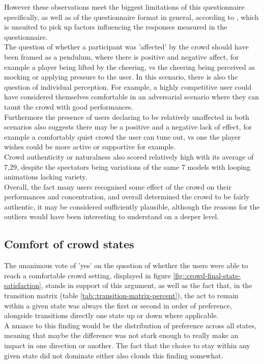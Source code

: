 However these observations meet the biggest limitations of this questionnaire specifically, as well as of the questionnaire format in general, according to \cite{murcia-2020-evaluating}, which is unsuited to pick up factors influencing the responses measured in the questionnaire.\\
The question of whether a participant was 'affected' by the crowd should have been framed as a pendulum, where there is positive and negative affect, for example a player being lifted by the cheering, vs the cheering being perceived as mocking or applying pressure to the user. In this scenario, there is also the question of individual perception. For example, a highly competitive user could have considered themselves comfortable in an adversarial scenario where they can taunt the crowd with good performances.\\
Furthermore the presence of users declaring to be relatively unaffected in both scenarios also suggests there may be a positive and a negative lack of effect, for example a comfortably quiet crowd the user can tune out, vs one the player wishes could be more active or supportive for example.\\

Crowd authenticity or naturalness also scored relatively high with its average of 7,29, despite the spectators being variations of the same 7 models with looping animations lacking variety.\\

Overall, the fact many users recognised some effect of the crowd on their performances and concentration, and overall determined the crowd to be fairly authentic, it may be considered sufficiently plausible, although the reasons for the outliers would have been interesting to understand on a deeper level.\\

\subsection{Comfort of crowd states}

The unanimous vote of 'yes' on the question of whether the users were able to reach a comfortable crowd setting, displayed in figure \ref{fig::crowd-final-state-satisfaction}, stands in support of this argument, as well as the fact that, in the transition matrix (table \ref{tab::transition-matrix-percent}), the act to remain within a given state was always the first or second in order of preference, alongside transitions directly one state up or down where applicable.\\
A nuance to this finding would be the distribution of preference across all states, meaning that maybe the difference was not stark enough to really make an impact in one direction or another. The fact that the choice to stay within any given state did not dominate either also clouds this finding somewhat.\\


